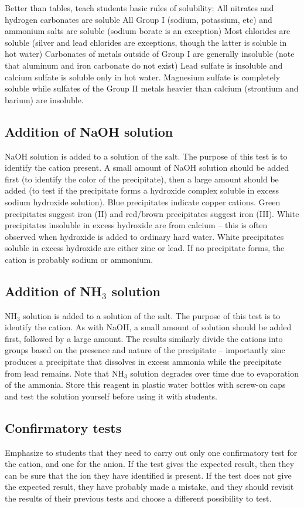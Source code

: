 Better than tables, 
teach students basic rules of solubility:
All nitrates and hydrogen carbonates are soluble
All Group I (sodium, 
potassium, 
etc) and ammonium salts are soluble (sodium borate is an exception)
Most chlorides are soluble (silver and lead chlorides are exceptions, 
though the latter is soluble in hot water)
Carbonates of metals outside of Group I are generally insoluble 
(note that aluminum and iron carbonate do not exist)
Lead sulfate is insoluble and calcium sulfate is soluble only in hot water. 
Magnesium sulfate is completely soluble 
while sulfates of the Group II metals heavier than calcium 
(strontium and barium) are insoluble.

\subsection{Addition of NaOH solution}
NaOH solution is added to a solution of the salt. 
The purpose of this test is to identify the cation present. 
A small amount of NaOH solution should be added first 
(to identify the color of the precipitate), 
then a large amount should be added (to test if the precipitate 
forms a hydroxide complex soluble in excess sodium hydroxide solution). 
Blue precipitates indicate copper cations. 
Green precipitates suggest iron (II) 
and red/brown precipitates suggest iron (III). 
White precipitates insoluble in excess hydroxide are from calcium – 
this is often observed when hydroxide is added to ordinary hard water. 
White precipitates soluble in excess hydroxide are either zinc or lead. 
If no precipitate forms, 
the cation is probably sodium or ammonium.

\subsection{Addition of NH$_{3}$ solution}
NH$_{3}$ solution is added to a solution of the salt. 
The purpose of this test is to identify the cation. 
As with NaOH, 
a small amount of solution should be added first, 
followed by a large amount. 
The results similarly divide the cations into groups 
based on the presence and nature of the precipitate – 
importantly zinc produces a precipitate that dissolves in excess ammonia 
while the precipitate from lead remains. 
Note that NH$_{3}$ solution degrades over time 
due to evaporation of the ammonia. 
Store this reagent in plastic water bottles with screw-on caps 
and test the solution yourself before using it with students.

\subsection{Confirmatory tests}
Emphasize to students that they need to carry out 
only one confirmatory test for the cation, 
and one for the anion. 
If the test gives the expected result, 
then they can be sure that the ion they have identified is present. 
If the test does not give the expected result, 
they have probably made a mistake, 
and they should revisit the results of their previous tests 
and choose a different possibility to test.

